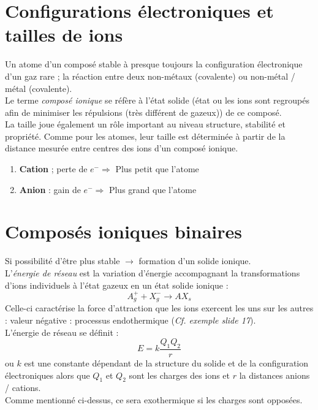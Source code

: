 \documentclass[british,french,11pt, a4paper, openany]{book}
\begin{document}
\section{Configurations électroniques et tailles de ions}
Un atome d'un composé stable à presque toujours la configuration électronique d'un gaz rare ; la réaction entre deux non-métaux (covalente) ou non-métal / métal (covalente).\\

Le terme \textit{composé ionique} se réfère à l'état solide (état ou les ions sont regroupés afin de minimiser les répulsions (très différent de gazeux)) de ce composé.\\

La taille joue également un rôle important au niveau structure, stabilité et propriété. Comme pour les atomes, leur taille est déterminée à partir de la distance mesurée entre centres des ions d'un composé ionique.

\begin{enumerate}
	\item \textbf{Cation} ; perte de $e^- \Rightarrow$ Plus petit que l'atome
	\item \textbf{Anion} : gain de $e^- \Rightarrow$ Plus grand que l'atome
\end{enumerate}

\section{Composés ioniques binaires}
Si possibilité d'être plus stable $\rightarrow$ formation d'un solide ionique.\\
L'\textit{énergie de réseau} est la variation d'énergie accompagnant la transformations d'ions individuels à l'état gazeux en un état solide ionique : 
$$A^+_g + X^-_g \rightarrow AX_s$$
Celle-ci caractérise la force d'attraction que les ions exercent les uns sur les autres : valeur négative : processus endothermique (\textit{Cf. exemple slide 17}).\\
L'énergie de réseau se définit : 
$$E = k \frac{Q_1 Q_2}{r}$$
ou $k$ est une constante dépendant de la structure du solide et de la configuration électroniques alors que $Q_1$ et $Q_2$ sont les charges des ions et $r$ la distances anions / cations.\\
Comme mentionné ci-dessus, ce sera exothermique si les charges sont opposées.
\end{document}
